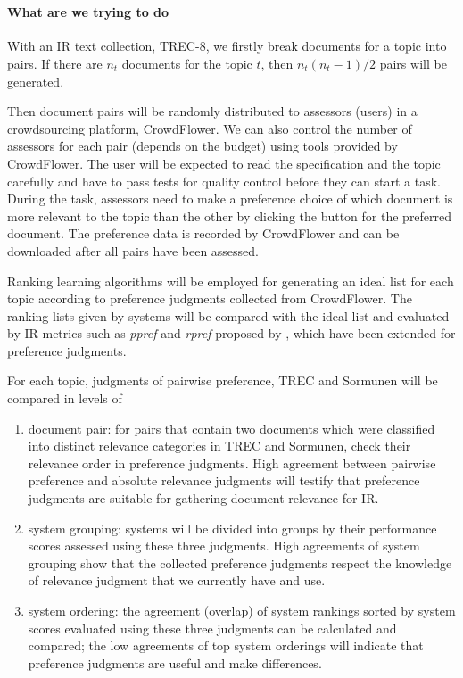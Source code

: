 \documentclass{article}
\begin{document}
\\[1em]
\paragraph{What are we trying to do} With an IR text collection, TREC-8, we firstly break documents for a topic into pairs. If there are $n_t$ documents for the topic $t$, then $n_t(n_t-1)/2$ pairs will be generated. 

Then document pairs will be randomly distributed to assessors (users) in a crowdsourcing platform, CrowdFlower. We can also control the number of assessors for each pair (depends on the budget) using tools provided by CrowdFlower. The user will be expected to read the specification and the topic carefully and have to pass tests for quality control before they can start a task. During the task, assessors need to make a preference choice of which document is more relevant to the topic than the other by clicking the button for the preferred document. The preference data is recorded by CrowdFlower and can be downloaded after all pairs have been assessed. 


Ranking learning algorithms will be employed for generating an ideal list for each topic according to preference judgments collected from CrowdFlower. The ranking lists given by systems will be compared with the ideal list and evaluated by IR metrics such as \textit{ppref} and \textit{rpref} proposed by \citet{eval.measure.pref.judge}, which have been extended for preference judgments. 

For each topic, judgments of pairwise preference, TREC and Sormunen will be compared in levels of 
\begin{enumerate}
\item document pair: for pairs that contain two documents which were classified into distinct relevance categories in TREC and Sormunen, check their relevance order in preference judgments. High agreement between pairwise preference and absolute relevance judgments will testify that preference judgments are suitable for gathering document relevance for IR.
\item system grouping: systems will be divided into groups by their performance scores assessed using these three judgments. High agreements of system grouping show that the collected preference judgments respect the knowledge of relevance judgment that we currently have and use.
\item system ordering: the agreement (overlap) of system rankings sorted by system scores evaluated using these three judgments can be calculated and compared; the low agreements of top system orderings will indicate that preference judgments are useful and make differences.
\end{enumerate}
\end{document}
